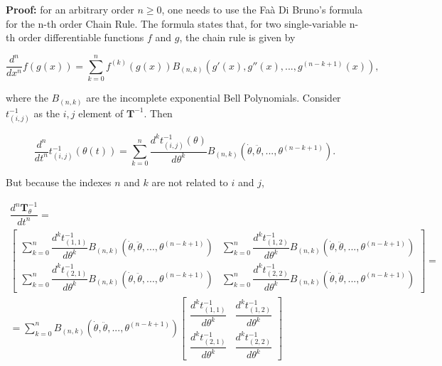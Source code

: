 \textbf{Proof:} for an arbitrary order $n \geq 0$, one needs to use the Faà Di Bruno's formula  for the n-th order Chain Rule. The formula states that, for two single-variable n-th order differentiable functions $f$ and $g$, the chain rule is given by

\begin{equation} \dfrac{d^n}{dx^n} f\left(g\left(x\right)\right)= \sum\limits_{k=0}^n f^{\left(k\right)}\left(g\left(x\right)\right) B_{\left(n,k\right)}\left(g'\left(x\right),g''\left(x\right),...,g^{\left(n-k+1\right)}\left(x\right)\right), \end{equation}

	\noindent where the $B_{\left(n,k\right)}$ are the incomplete exponential Bell Polynomials. Consider $t^{-1}_{\left(i,j\right)}$ as the $i,j$ element of $\mathbf{T}^{-1}$. Then	

\begin{equation} \dfrac{d^n}{dt^n} t^{-1}_{\left(i,j\right)} \left(\theta\left(t\right)\right)= \sum\limits_{k=0}^n \dfrac{d^k t^{-1}_{\left(i,j\right)}\left(\theta\right)}{d\theta^k} B_{\left(n,k\right)}\left(\dot{\theta},\ddot{\theta},...,\theta^{(n-k+1)}\right). \end{equation}

	But because the indexes $n$ and $k$ are not related to $i$ and $j$, 

\begin{gather} \dfrac{d^n\mathbf{T}^{-1}_\theta}{dt^n} = \nonumber\\[5mm]
	\left[\begin{array}{cc}
\sum\limits_{k=0}^n \dfrac{d^k t^{-1}_{\left(1,1\right)}}{d\theta^k} B_{\left(n,k\right)}\left(\dot{\theta},\ddot{\theta},...,\theta^{(n-k+1)}\right) & \sum\limits_{k=0}^n \dfrac{d^k t^{-1}_{\left(1,2\right)}}{d\theta^k} B_{\left(n,k\right)}\left(\dot{\theta},\ddot{\theta},...,\theta^{(n-k+1)}\right) \\[5mm]
\sum\limits_{k=0}^n \dfrac{d^k t^{-1}_{\left(2,1\right)}}{d\theta^k} B_{\left(n,k\right)}\left(\dot{\theta},\ddot{\theta},...,\theta^{(n-k+1)}\right) & \sum\limits_{k=0}^n \dfrac{d^k t^{-1}_{\left(2,2\right)}}{d\theta^k} B_{\left(n,k\right)}\left(\dot{\theta},\ddot{\theta},...,\theta^{(n-k+1)}\right)
\end{array}\right] = \nonumber\\[5mm]
%
	= \sum\limits_{k=0}^n  B_{\left(n,k\right)}\left(\dot{\theta},\ddot{\theta},...,\theta^{(n-k+1)}\right)\left[\begin{array}{ccc}
\dfrac{d^k t^{-1}_{\left(1,1\right)}}{d\theta^k} & \dfrac{d^k t^{-1}_{\left(1,2\right)}}{d\theta^k} \\[5mm]
\dfrac{d^k t^{-1}_{\left(2,1\right)}}{d\theta^k} & \dfrac{d^k t^{-1}_{\left(2,2\right)}}{d\theta^k}
\end{array}\right]
\end{gather}

